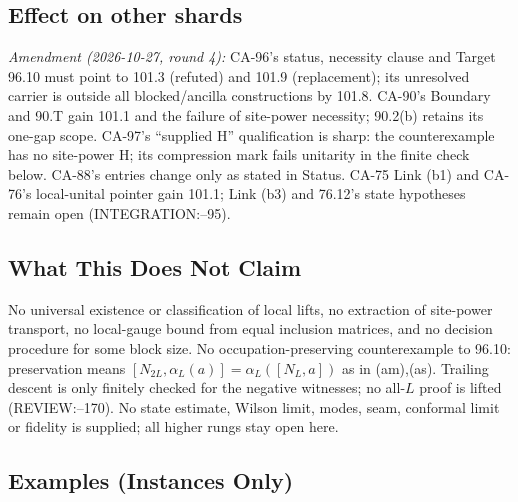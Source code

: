\subsection{Effect on other shards}

\emph{Amendment (2026-10-27, round 4):} CA-96's status, necessity clause and Target 96.10 must point to 101.3
(refuted) and 101.9 (replacement); its unresolved carrier is outside all blocked/ancilla constructions by 101.8.
CA-90's Boundary and 90.T gain 101.1 and the failure of site-power necessity; 90.2(b) retains its one-gap scope.
CA-97's ``supplied H'' qualification is sharp: the counterexample has no site-power H; its compression mark fails
unitarity in the finite check below. CA-88's entries change only as stated in Status. CA-75 Link (b1) and CA-76's
local-unital pointer gain 101.1; Link (b3) and 76.12's state hypotheses remain open (INTEGRATION:--95).

\subsection{What This Does Not Claim}

No universal existence or classification of local lifts, no extraction of site-power transport, no local-gauge
bound from equal inclusion matrices, and no decision procedure for some block size. No occupation-preserving
counterexample to 96.10: preservation means \([N_{2L},\alpha_L(a)]=\alpha_L([N_L,a])\) as in (am),(as).
Trailing descent is only finitely checked for the negative witnesses; no all-\(L\) proof is lifted (REVIEW:--170).
No state estimate, Wilson limit, modes, seam, conformal limit or fidelity is supplied; all higher rungs stay open here.

\subsection{Examples (Instances Only)}

